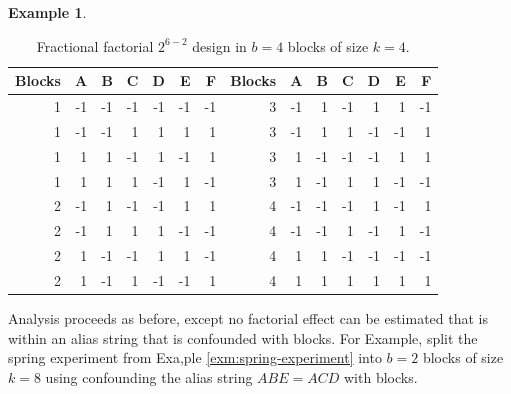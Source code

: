 \documentclass[
]{book}
\newenvironment{Shaded}{\begin{snugshade}}{\end{snugshade}}
\newcommand{\AttributeTok}[1]{\textcolor[rgb]{0.77,0.63,0.00}{#1}}
\newcommand{\DecValTok}[1]{\textcolor[rgb]{0.00,0.00,0.81}{#1}}
\newcommand{\FunctionTok}[1]{\textcolor[rgb]{0.00,0.00,0.00}{#1}}
\newcommand{\NormalTok}[1]{#1}
\newcommand{\OtherTok}[1]{\textcolor[rgb]{0.56,0.35,0.01}{#1}}
\newcommand{\SpecialCharTok}[1]{\textcolor[rgb]{0.00,0.00,0.00}{#1}}
\theoremstyle{definition}
\theoremstyle{definition}
\newtheorem{example}{Example}[chapter]
\theoremstyle{definition}
\theoremstyle{definition}
\theoremstyle{remark}
\begin{document}
\begin{example}
\begin{table}
\caption{\label{tab:frac-block-design}Fractional factorial 
      $2^{6-2}$ design in $b=4$ blocks of size $k=4$.}
\centering
\begin{tabular}[t]{r|r|r|r|r|r|r|r|r|r|r|r|r|r}
\hline
Blocks & A & B & C & D & E & F & Blocks & A & B & C & D & E & F\\
\hline
1 & -1 & -1 & -1 & -1 & -1 & -1 & 3 & -1 & 1 & -1 & 1 & 1 & -1\\
\hline
1 & -1 & -1 & 1 & 1 & 1 & 1 & 3 & -1 & 1 & 1 & -1 & -1 & 1\\
\hline
1 & 1 & 1 & -1 & 1 & -1 & 1 & 3 & 1 & -1 & -1 & -1 & 1 & 1\\
\hline
1 & 1 & 1 & 1 & -1 & 1 & -1 & 3 & 1 & -1 & 1 & 1 & -1 & -1\\
\hline
2 & -1 & 1 & -1 & -1 & 1 & 1 & 4 & -1 & -1 & -1 & 1 & -1 & 1\\
\hline
2 & -1 & 1 & 1 & 1 & -1 & -1 & 4 & -1 & -1 & 1 & -1 & 1 & -1\\
\hline
2 & 1 & -1 & -1 & 1 & 1 & -1 & 4 & 1 & 1 & -1 & -1 & -1 & -1\\
\hline
2 & 1 & -1 & 1 & -1 & -1 & 1 & 4 & 1 & 1 & 1 & 1 & 1 & 1\\
\hline
\end{tabular}
\end{table}

\end{example}

Analysis proceeds as before, except no factorial effect can be estimated that is within an alias string that is confounded with blocks. For Example, split the spring experiment from Exa,ple \ref{exm:spring-experiment} into \(b=2\) blocks of size \(k=8\) using confounding the alias string \(ABE = ACD\) with blocks.

\begin{Shaded}
\end{Shaded}
\end{document}
